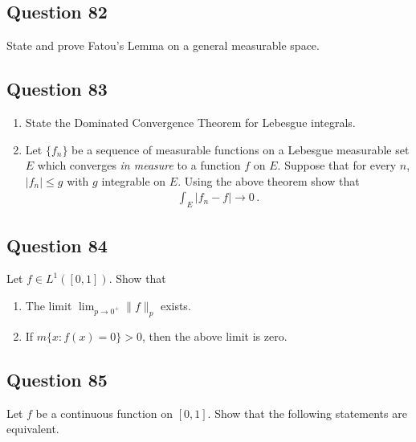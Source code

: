 \documentclass[12pt]{article}
\begin{document}
\hypertarget{question-82-1}{%
\subsection{Question 82}\label{question-82-1}}

State and prove Fatou's Lemma on a general measurable space.

\hypertarget{question-83-1}{%
\subsection{Question 83}\label{question-83-1}}

\begin{enumerate}
\def\labelenumi{\arabic{enumi}.}
\item
  State the Dominated Convergence Theorem for Lebesgue integrals.
\item
  Let \(\{f_n\}\) be a sequence of measurable functions on a Lebesgue
  measurable set \(E\) which converges \emph{in measure} to a function
  \(f\) on \(E\). Suppose that for every \(n\), \(|f_n| \leq g\) with
  \(g\) integrable on \(E\). Using the above theorem show that
  \begin{align*}
      \int_E |f_n-f| \longrightarrow 0 \, .
  \end{align*}
\end{enumerate}

\hypertarget{question-84-1}{%
\subsection{Question 84}\label{question-84-1}}

Let \(f\in L^1([0,1])\). Show that

\begin{enumerate}
\def\labelenumi{\arabic{enumi}.}
\item
  The limit \(\lim_{p\to 0^+} \| f \|_p\) exists.
\item
  If \(m \{x : f(x) = 0\} > 0\), then the above limit is zero.
\end{enumerate}

\hypertarget{question-85-1}{%
\subsection{Question 85}\label{question-85-1}}

Let \(f\) be a continuous function on \([0,1]\). Show that the following
statements are equivalent.
\end{document}
